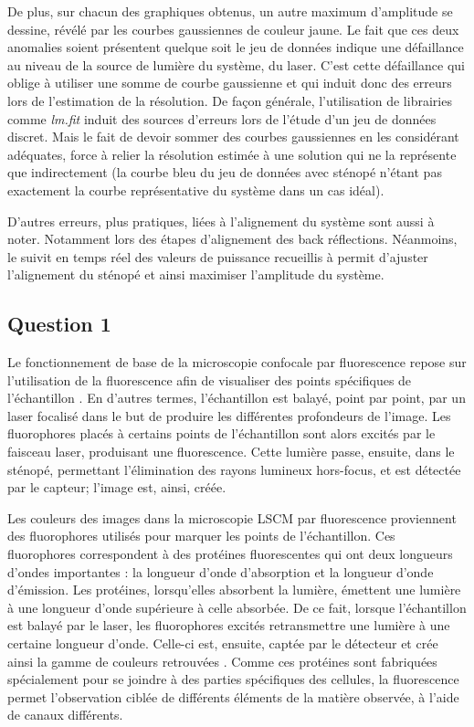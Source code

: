 \documentclass[11pt,letterpaper]{article}
\begin{document}
De plus, sur chacun des graphiques obtenus, un autre maximum d'amplitude se dessine, révélé par les courbes gaussiennes de couleur jaune. Le fait que ces deux anomalies soient présentent quelque soit le jeu de données indique une défaillance au niveau de la source de lumière du système, du laser. C'est cette défaillance qui oblige à utiliser une somme de courbe gaussienne et qui induit donc des erreurs lors de l'estimation de la résolution. De façon générale, l'utilisation de librairies comme \textit{lm.fit} induit des sources d'erreurs lors de l'étude d'un jeu de données discret. Mais le fait de devoir sommer des courbes gaussiennes en les considérant adéquates, force à relier la résolution estimée à une solution qui ne la représente que indirectement (la courbe bleu du jeu de données avec sténopé n'étant pas exactement la courbe représentative du système dans un cas idéal).

D'autres erreurs, plus pratiques, liées à l'alignement du système sont aussi à noter. Notamment lors des étapes d'alignement des back réflections. Néanmoins, le suivit en temps réel des valeurs de puissance recueillis à permit d'ajuster l'alignement du sténopé et ainsi maximiser l'amplitude du système. 

\subsection{Question 1}
Le fonctionnement de base de la microscopie confocale par fluorescence repose sur l'utilisation de la fluorescence afin de visualiser des points spécifiques de l'échantillon \cite{elliott_confocal_2020}. En d'autres termes, l'échantillon est balayé, point par point, par un laser focalisé dans le but de produire les différentes profondeurs de l'image. Les fluorophores placés à certains points de l'échantillon sont alors excités par le faisceau laser, produisant une fluorescence. Cette lumière passe, ensuite, dans le sténopé, permettant l'élimination des rayons lumineux hors-focus, et est détectée par le capteur; l'image est, ainsi, créée.

Les couleurs des images dans la microscopie LSCM par fluorescence proviennent des fluorophores utilisés pour marquer les points de l'échantillon. Ces fluorophores correspondent à des protéines fluorescentes qui ont deux longueurs d'ondes importantes : la longueur d'onde d'absorption et la longueur d'onde d'émission. Les protéines, lorsqu'elles absorbent la lumière, émettent une lumière à une longueur d'onde supérieure à celle absorbée. De ce fait, lorsque l'échantillon est balayé par le laser, les fluorophores excités retransmettre une lumière à une certaine longueur d'onde. Celle-ci est, ensuite, captée par le détecteur et crée ainsi la gamme de couleurs retrouvées \cite{leclerc_proteines_2014}. Comme ces protéines sont fabriquées spécialement pour se joindre à des parties spécifiques des cellules, la fluorescence permet l'observation ciblée de différents éléments de la matière observée, à l'aide de canaux différents.
\end{document}
